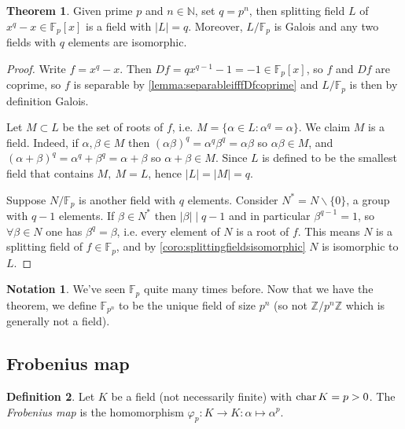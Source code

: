 \documentclass[a4paper]{article}
\newcommand{\Z}{\mathbb Z}
\newcommand{\Char}{\text{char\,}}
\theoremstyle{definition}
\newtheorem{defn}{Definition}[subsection]
\newtheorem{thm}[defn]{Theorem}
\newtheorem*{notation}{Notation}
\begin{document}
\begin{thm}
Given prime $p$ and $n\in\mathbb N$, set $q=p^n$, then splitting field $L$ of $x^q-x\in\mathbb F_p[x]$ is a field with $|L|=q$. Moreover, $L/\mathbb F_p$ is Galois and any two fields with $q$ elements are isomorphic.
\end{thm}
\begin{proof}
Write $f=x^q-x$. Then $Df=qx^{q-1}-1=-1\in\mathbb F_p[x]$, so $f$ and $Df$ are coprime, so $f$ is separable by \ref{lemma:separableifffDfcoprime} and $L/\mathbb F_p$ is then by definition Galois.

Let $M\subset L$ be the set of roots of $f$, i.e. $M=\{\alpha\in L:\alpha^q=\alpha\}$. We claim $M$ is a field. Indeed, if $\alpha,\beta\in M$ then $(\alpha\beta)^q=\alpha^q\beta^q=\alpha\beta$ so $\alpha\beta\in M$, and $(\alpha+\beta)^q=\alpha^q+\beta^q=\alpha+\beta$ so $\alpha+\beta\in M$. Since $L$ is defined to be the smallest field that contains $M,\ M=L$, hence $|L|=|M|=q$.

Suppose $N/\mathbb F_p$ is another field with $q$ elements. Consider $N^\ast=N\backslash \{0\}$, a group with $q-1$ elements. If $\beta\in N^\ast$ then $|\beta|\mid q-1$ and in particular $\beta^{q-1}=1$, so $\forall\beta\in N$ one has $\beta^q=\beta$, i.e. every element of $N$ is a root of $f$. This means $N$ is a splitting field of $f\in\mathbb F_p$, and by \ref{coro:splittingfieldsisomorphic} $N$ is isomorphic to $L$.
\end{proof}

\begin{notation}
We've seen $\mathbb F_p$ quite many times before. Now that we have the theorem, we define $\mathbb F_{p^n}$ to be the unique field of size $p^n$ (so not $\Z/p^n\Z$ which is generally not a field).
\end{notation}

\subsection{Frobenius map}
\begin{defn}
Let $K$ be a field (not necessarily finite) with $\Char K=p>0$. The \textit{Frobenius map} is the homomorphism $\varphi_p:K\rightarrow K:\alpha\mapsto\alpha^p$.
\end{defn}
\end{document}
